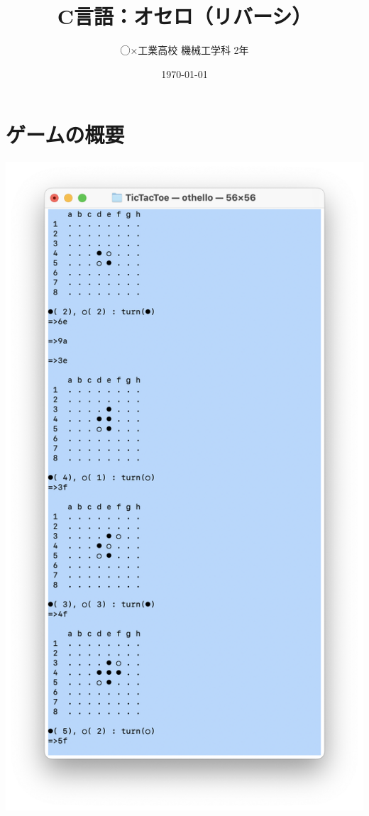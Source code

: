 \documentclass[uplatex,a4paper,11pt,oneside,openany]{jsarticle}
\begin{document}
	\title{C言語：オセロ（リバーシ）}
	\author{◯×工業高校 機械工学科 2年}
	\date{\today}
	\maketitle
	\pagestyle{empty}

	
\section{ゲームの概要}

\includegraphics[keepaspectratio,scale=0.5]{othelloview.png}
\end{document}
